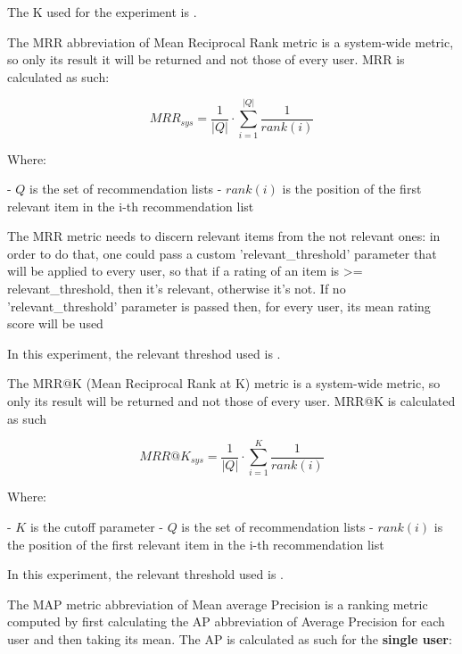 The K used for the experiment is .


The MRR abbreviation of Mean Reciprocal Rank metric is a system-wide metric, so only its result it will be returned and not those
of every user. MRR is calculated as such:

    \[
    MRR_{sys} = \frac{1}{|Q|}\cdot\sum_{i=1}^{|Q|}\frac{1}{rank(i)}
    \]

    Where:

    - $Q$ is the set of recommendation lists
    - $rank(i)$ is the position of the first relevant item in the i-th recommendation list

\hfill\break

The MRR metric needs to discern relevant items from the not relevant ones: in order to do that, one could pass a
custom 'relevant_threshold' parameter that will be applied to every user, so that if a rating of an item
is >= relevant_threshold, then it's relevant, otherwise it's not.
If no 'relevant_threshold' parameter is passed then, for every user, its mean rating score will be used

In this experiment, the relevant threshod used is
.



The MRR@K (Mean Reciprocal Rank at K) metric is a system-wide metric, so only its result will be returned and
not those of every user. MRR@K is calculated as such

    \[
    MRR@K_{sys} = \frac{1}{|Q|}\cdot\sum_{i=1}^{K}\frac{1}{rank(i)}
    \]

    Where:

    - $K$ is the cutoff parameter
    - $Q$ is the set of recommendation lists
    - $rank(i)$ is the position of the first relevant item in the i-th recommendation list

\hfill\break
In this experiment, the relevant threshold used is
.



The MAP metric abbreviation of Mean average Precision is a ranking metric computed by first calculating the AP
abbreviation of Average Precision for each user and then taking its mean.
The AP is calculated as such for the \textbf{single user}:

